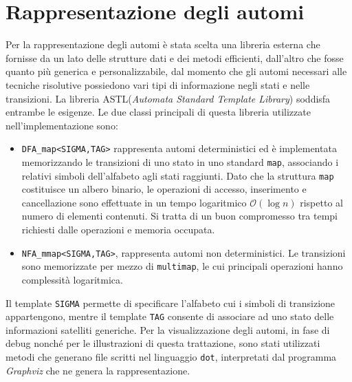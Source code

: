 \section{Rappresentazione degli automi}
Per la rappresentazione degli automi è stata scelta una libreria esterna che fornisse da un lato delle strutture dati e dei metodi efficienti, dall'altro che fosse quanto più generica e personalizzabile, dal momento che gli automi necessari alle tecniche risolutive possiedono vari tipi di informazione negli stati e nelle transizioni. La libreria ASTL(\emph{Automata Standard Template Library})\cite{web:astl} soddisfa entrambe le esigenze. Le due classi principali di questa libreria utilizzate nell'implementazione sono:
\begin{itemize}
\item \verb|DFA_map<SIGMA,TAG>| rappresenta automi deterministici ed è implementata memorizzando le transizioni di uno stato in uno standard \verb|map|, associando i relativi simboli dell'alfabeto agli stati raggiunti. Dato che la struttura \verb|map| costituisce un albero binario, le operazioni di accesso, inserimento e cancellazione sono effettuate in un tempo logaritmico $\mathcal{O}(\log n)$ rispetto al numero di elementi contenuti.  Si tratta di un buon compromesso tra tempi richiesti dalle operazioni e memoria occupata.
\item \verb|NFA_mmap<SIGMA,TAG>|, rappresenta automi non deterministici. Le transizioni sono memorizzate per mezzo di \verb|multimap|, le cui principali operazioni hanno complessità logaritmica.
\end{itemize}
Il template \verb|SIGMA| permette di specificare l'alfabeto cui i simboli di transizione appartengono, mentre il template \verb|TAG| consente di associare ad uno stato delle informazioni satelliti generiche. 
Per la visualizzazione degli automi, in fase di debug nonché per le illustrazioni di questa trattazione, sono stati utilizzati metodi che generano file scritti nel linguaggio \verb|dot|, interpretati dal programma \emph{Graphviz}\cite{web:graphviz} che ne genera la rappresentazione.

